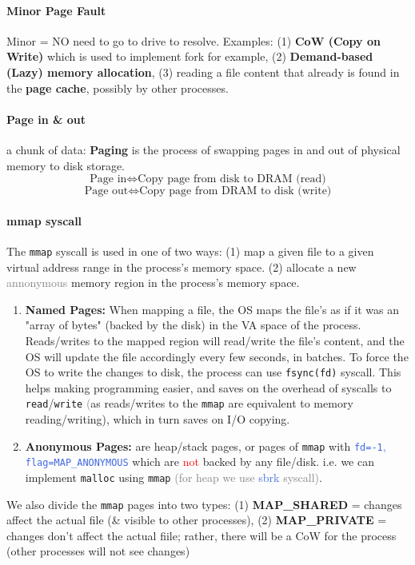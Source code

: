 \documentclass[openany,12pt]{book}
\newcommand{\code}[1]{\texttt{#1}}
\newcommand{\red}[1]{\textcolor{Red}{#1}}
\newcommand{\blue}[1]{\textcolor{RoyalBlue}{#1}}
\newcommand{\gray}[1]{\textcolor{gray}{#1}}
\begin{document}
\paragraph{Minor Page Fault} Minor = NO need to go to drive to resolve.
Examples: (1) \textbf{CoW (Copy on Write)} which is used to implement fork for example, (2) \textbf{Demand-based (Lazy) memory allocation}, (3) reading a file content that already is found in the \textbf{page cache}, possibly by other processes.

\paragraph{Page in \& out} a chunk of data: \textbf{Paging} is the process of swapping pages in and out of physical memory to disk storage.
$$
\text{Page in} \Longleftrightarrow \text{Copy page from disk to DRAM (read)}
$$
$$
\text{Page out} \Longleftrightarrow \text{Copy page from DRAM to disk (write)}
$$


\paragraph{mmap syscall} The \code{mmap} syscall is used in one of two ways: (1) map a given file to a given virtual address range in the process's memory space. (2) allocate a new \gray{annonymous} memory region in the process's memory space. 
\begin{enumerate}
  \item \textbf{Named Pages:} When mapping a file, the OS maps the file's as if it was an "array of bytes" (backed by the disk) in the VA space of the process. Reads/writes to the mapped region will read/write the file's content, and the OS will update the file accordingly every few seconds, in batches. To force the OS to write the changes to disk, the process can use \code{fsync(fd)} syscall. This helps making programming easier, and saves on the overhead of syscalls to \code{read}/\code{write} \gray(as reads/writes to the \code{mmap} are equivalent to memory reading/writing), which in turn saves on I/O copying.

  \item \textbf{Anonymous Pages:} are heap/stack pages, or pages of \code{mmap} with \blue{\code{fd=-1}, \code{flag=MAP\_ANONYMOUS}} which are \red{not} backed by any file/disk. i.e. we can implement \code{malloc} using \code{mmap} \gray{(for heap we use} \blue{sbrk} \gray{syscall)}.
\end{enumerate}
We also divide the \code{mmap} pages into two types: (1) \textbf{MAP\_SHARED} = changes affect the actual file (\& visible to other processes), (2) \textbf{MAP\_PRIVATE} = changes don't affect the actual fiile; rather, there will be a CoW for the process (other processes will not see changes)
\end{document}
